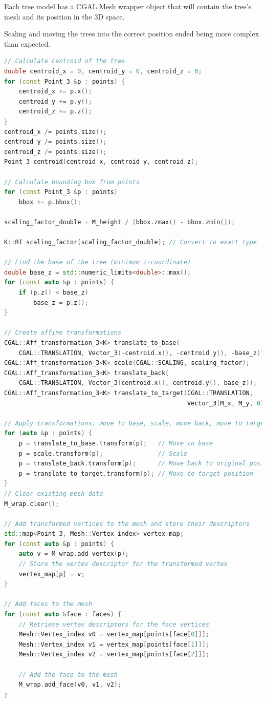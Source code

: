\documentclass[12pt]{article}
\begin{document}
Each tree model has a CGAL \href{https://doc.cgal.org/latest/Surface_mesh/classCGAL_1_1Surface__mesh.html}{Mesh}
wrapper object that will contain the tree's
mesh and its position in the 3D space.

Scaling and moving the trees into the correct position ended being more complex
than expected.

\begin{lstlisting}[language=C++]
// Calculate centroid of the tree
double centroid_x = 0, centroid_y = 0, centroid_z = 0;
for (const Point_3 &p : points) {
    centroid_x += p.x();
    centroid_y += p.y();
    centroid_z += p.z();
}
centroid_x /= points.size();
centroid_y /= points.size();
centroid_z /= points.size();
Point_3 centroid(centroid_x, centroid_y, centroid_z);

// Calculate bounding box from points
for (const Point_3 &p : points)
    bbox += p.bbox();

scaling_factor_double = M_height / (bbox.zmax() - bbox.zmin());

K::RT scaling_factor(scaling_factor_double); // Convert to exact type

// Find the base of the tree (minimum z-coordinate)
double base_z = std::numeric_limits<double>::max();
for (const auto &p : points) {
    if (p.z() < base_z)
        base_z = p.z();
}

// Create affine transformations
CGAL::Aff_transformation_3<K> translate_to_base(
    CGAL::TRANSLATION, Vector_3(-centroid.x(), -centroid.y(), -base_z));
CGAL::Aff_transformation_3<K> scale(CGAL::SCALING, scaling_factor);
CGAL::Aff_transformation_3<K> translate_back(
    CGAL::TRANSLATION, Vector_3(centroid.x(), centroid.y(), base_z));
CGAL::Aff_transformation_3<K> translate_to_target(CGAL::TRANSLATION,
                                                  Vector_3(M_x, M_y, 0));

// Apply transformations: move to base, scale, move back, move to target
for (auto &p : points) {
    p = translate_to_base.transform(p);   // Move to base
    p = scale.transform(p);               // Scale
    p = translate_back.transform(p);      // Move back to original position
    p = translate_to_target.transform(p); // Move to target position
}
// Clear existing mesh data
M_wrap.clear();

// Add transformed vertices to the mesh and store their descriptors
std::map<Point_3, Mesh::Vertex_index> vertex_map;
for (const auto &p : points) {
    auto v = M_wrap.add_vertex(p);
    // Store the vertex descriptor for the transformed vertex
    vertex_map[p] = v;
}

// Add faces to the mesh
for (const auto &face : faces) {
    // Retrieve vertex descriptors for the face vertices
    Mesh::Vertex_index v0 = vertex_map[points[face[0]]];
    Mesh::Vertex_index v1 = vertex_map[points[face[1]]];
    Mesh::Vertex_index v2 = vertex_map[points[face[2]]];

    // Add the face to the mesh
    M_wrap.add_face(v0, v1, v2);
}
\end{lstlisting}
\end{document}
